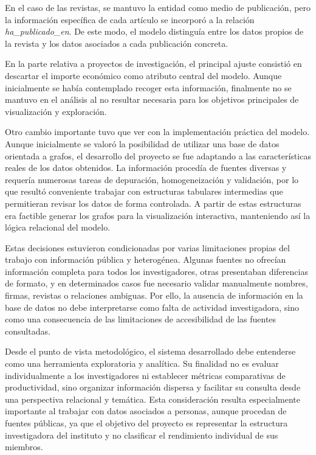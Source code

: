 \documentclass[11pt,spanish,listoffigures,listoftables]{tfgetsinf}
\begin{document}
En el caso de las revistas, se mantuvo la entidad como medio de publicación, pero la información específica de cada artículo se incorporó a la relación \textit{ha\_publicado\_en}. De este modo, el modelo distinguía entre los datos propios de la revista y los datos asociados a cada publicación concreta.

En la parte relativa a proyectos de investigación, el principal ajuste consistió en descartar el importe económico como atributo central del modelo. Aunque inicialmente se había contemplado recoger esta información, finalmente no se mantuvo en el análisis al no resultar necesaria para los objetivos principales de visualización y exploración.

Otro cambio importante tuvo que ver con la implementación práctica del modelo. Aunque inicialmente se valoró la posibilidad de utilizar una base de datos orientada a grafos, el desarrollo del proyecto se fue adaptando a las características reales de los datos obtenidos. La información procedía de fuentes diversas y requería numerosas tareas de depuración, homogeneización y validación, por lo que resultó conveniente trabajar con estructuras tabulares intermedias que permitieran revisar los datos de forma controlada. A partir de estas estructuras era factible generar los grafos para la visualización interactiva, manteniendo así la lógica relacional del modelo.

Estas decisiones estuvieron condicionadas por varias limitaciones propias del trabajo con información pública y heterogénea. Algunas fuentes no ofrecían información completa para todos los investigadores, otras presentaban diferencias de formato, y en determinados casos fue necesario validar manualmente nombres, firmas, revistas o relaciones ambiguas. Por ello, la ausencia de información en la base de datos no debe interpretarse como falta de actividad investigadora, sino como una consecuencia de las limitaciones de accesibilidad de las fuentes consultadas.

Desde el punto de vista metodológico, el sistema desarrollado debe entenderse como una herramienta exploratoria y analítica. Su finalidad no es evaluar individualmente a los investigadores ni establecer métricas comparativas de productividad, sino organizar información dispersa y facilitar su consulta desde una perspectiva relacional y temática. Esta consideración resulta especialmente importante al trabajar con datos asociados a personas, aunque procedan de fuentes públicas, ya que el objetivo del proyecto es representar la estructura investigadora del instituto y no clasificar el rendimiento individual de sus miembros.
\end{document}
